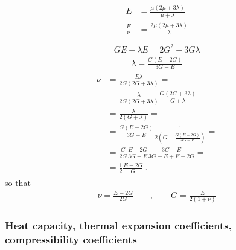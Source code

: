 \documentclass[letterpaper,10pt,english]{jupyterBook}
\begin{document}
\begin{equation*}
\begin{split}\begin{aligned}
  E & = \frac{\mu (2 \mu + 3 \lambda)}{\mu + \lambda} \\
  \frac{E}{\nu} & = \frac{2 \mu (2 \mu + 3 \lambda)}{\lambda} \\
\end{aligned}\end{split}
\end{equation*}\begin{equation*}
\begin{split}G E + \lambda E = 2 G^2 + 3 G \lambda\end{split}
\end{equation*}\begin{equation*}
\begin{split}\lambda = \frac{G (E - 2 G)}{ 3G - E }\end{split}
\end{equation*}\begin{equation*}
\begin{split}\begin{aligned}
  \nu
  & = \frac{E \lambda}{2G(2G+3 \lambda)} = \\
  & = \frac{\lambda}{2G(2G+3 \lambda)} \frac{G (2G + 3\lambda)}{G + \lambda} = \\
  & = \frac{\lambda}{2(G + \lambda)} = \\ 
  & = \frac{G(E-2G)}{3G - E} \frac{1}{2 \left( G + \frac{G(E-2G)}{3G-E} \right)} = \\
  & = \frac{G}{2G} \frac{E-2G}{3G - E} \frac{3G - E}{3G - E + E - 2G } = \\
  & = \frac{1}{2} \frac{E - 2G}{G} \ .
\end{aligned}\end{split}
\end{equation*}
\sphinxAtStartPar
so that
\begin{equation*}
\begin{split}\nu = \frac{E - 2G}{2G} \qquad , \qquad G = \frac{E}{2(1+\nu)}\end{split}
\end{equation*}

\subsubsection*{Heat capacity, thermal expansion coefficients, compressibility coefficients}
\end{document}

